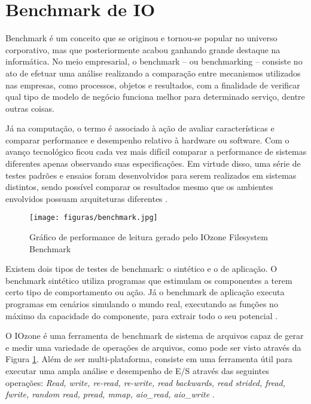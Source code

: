 \section{Benchmark de IO}
Benchmark é um conceito que se originou e tornou-se popular no universo corporativo, mas que posteriormente acabou ganhando grande destaque na informática. No meio empresarial, o benchmark – ou benchmarking – consiste no ato de efetuar uma análise realizando a comparação entre mecanismos utilizados nas empresas, como processos, objetos e resultados, com a finalidade de verificar qual tipo de modelo de negócio funciona melhor para determinado serviço, dentre outras coisas. 

Já na computação, o termo é associado à ação de avaliar características e comparar performance e desempenho relativo à hardware ou software. Com o avanço tecnológico ficou cada vez mais difícil comparar a performance de sistemas diferentes apenas observando suas especificações. Em virtude disso, uma série de testes padrões e ensaios foram desenvolvidos para serem realizados em sistemas distintos, sendo possível comparar os resultados mesmo que os ambientes envolvidos possuam arquiteturas diferentes \cite{benchmark}.

\begin{figure}[htb]
	\caption{\label{fig:iozone}Gráfico de performance de leitura gerado pelo IOzone Filesystem Benchmark}
	\begin{center}
	    \texttt{[image: figuras/benchmark.jpg]}
	\end{center}
\end{figure}

Existem dois tipos de testes de benchmark: o sintético e o de aplicação. O benchmark sintético utiliza programas que estimulam os componentes a terem certo tipo de comportamento ou ação. Já o benchmark de aplicação executa programas em cenários simulando o mundo real, executando as funções no máximo da capacidade do componente, para extrair todo o seu potencial \cite{benchmark_2}.

O IOzone é uma ferramenta de benchmark de sistema de arquivos capaz de gerar e medir uma variedade de operações de arquivos, como pode ser visto através da Figura \ref{fig:iozone}. Além de ser multi-plataforma, consiste em uma ferramenta útil para executar uma ampla análise e desempenho de E/S através das seguintes operações:\textit{ Read, write, re-read, re-write, read backwards, read strided, fread, fwrite, random read, pread, mmap, aio\_read, aio\_write } \cite{iozone}.